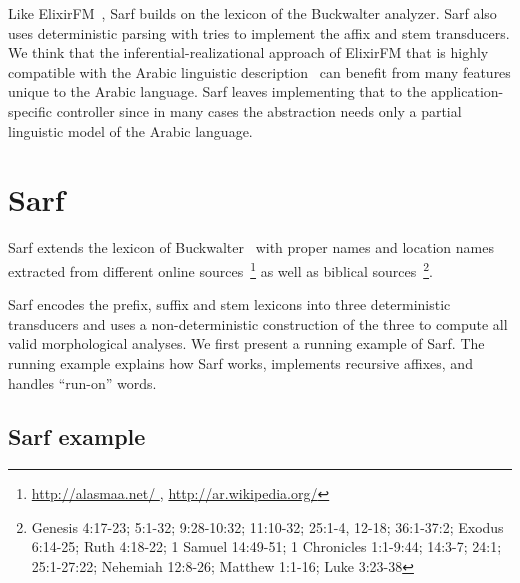 \documentclass[11pt]{article}
\begin{document}
Like ElixirFM~\cite{Otakar:07}, Sarf builds on the lexicon
of the Buckwalter analyzer. 
Sarf also uses deterministic parsing with tries 
to implement the affix and stem transducers. 
We think that the inferential-realizational approach 
of ElixirFM
that is highly compatible with the Arabic linguistic 
description~\cite{Badawi:04}
can benefit from many features unique to the Arabic language.
Sarf leaves implementing that to the application-specific controller
since in many cases the abstraction needs only a partial 
linguistic model of the Arabic language. 


\section{Sarf}
\label{sec:sarf}

Sarf extends the lexicon of Buckwalter~ with
proper names and location names extracted from different online 
sources~\footnote{\href{http://alasmaa.net/}{http://alasmaa.net/ }, 
\href{http://ar.wikipedia.org/}{http://ar.wikipedia.org/}}
as well as biblical sources~\footnote{Genesis 4:17-23; 5:1-32; 9:28-10:32; 11:10-32; 25:1-4, 12-18; 36:1-37:2; Exodus 6:14-25; Ruth 4:18-22; 1 Samuel 14:49-51; 1 Chronicles 1:1-9:44; 14:3-7; 24:1; 25:1-27:22; Nehemiah 12:8-26; Matthew 1:1-16; Luke 3:23-38}.

Sarf encodes the prefix, suffix and stem lexicons into
three deterministic transducers and 
uses a non-deterministic construction
of the three to compute all valid morphological analyses.
We first present a running example of Sarf.
The running example explains how Sarf works,
implements recursive affixes, and
handles ``run-on'' words.

\subsection{Sarf example}
\label{sec:example}

\transfalse
\begin{figure}[tb]
\end{figure}

\end{document}
